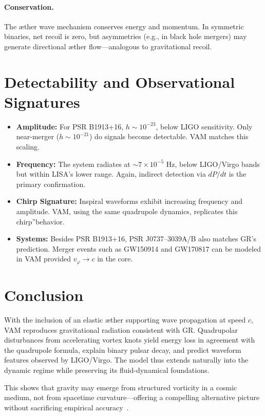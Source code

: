 \paragraph{Conservation.}
The æther wave mechanism conserves energy and momentum. In symmetric binaries, net recoil is zero, but asymmetries (e.g., in black hole mergers) may generate directional æther flow—analogous to gravitational recoil.

\section*{Detectability and Observational Signatures}

\begin{itemize}
\item \textbf{Amplitude:} For PSR B1913+16, $h \sim 10^{-23}$, below LIGO sensitivity. Only near-merger ($h \sim 10^{-21}$) do signals become detectable. VAM matches this scaling.
\item \textbf{Frequency:} The system radiates at $\sim 7 \times 10^{-5}$ Hz, below LIGO/Virgo bands but within LISA's lower range. Again, indirect detection via $dP/dt$ is the primary confirmation.
\item \textbf{Chirp Signature:} Inspiral waveforms exhibit increasing frequency and amplitude. VAM, using the same quadrupole dynamics, replicates this \grqq chirp\textquotedblright behavior.
\item \textbf{Systems:} Besides PSR B1913+16, PSR J0737–3039A/B also matches GR's prediction. Merger events such as GW150914 and GW170817 can be modeled in VAM provided $v_\varphi \rightarrow c$ in the core.
\end{itemize}

\section*{Conclusion}

With the inclusion of an elastic æther supporting wave propagation at speed $c$, VAM reproduces gravitational radiation consistent with GR. Quadrupolar disturbances from accelerating vortex knots yield energy loss in agreement with the quadrupole formula, explain binary pulsar decay, and predict waveform features observed by LIGO/Virgo. The model thus extends naturally into the dynamic regime while preserving its fluid-dynamical foundations.

This shows that gravity may emerge from structured vorticity in a cosmic medium, not from spacetime curvature—offering a compelling alternative picture without sacrificing empirical accuracy~\cite{iskandarani2025VAM3}.
